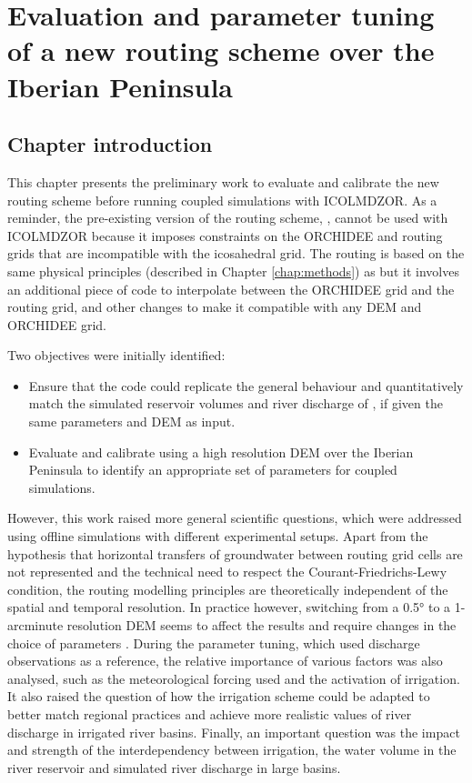 \chapter{Evaluation and parameter tuning of a new routing scheme over the Iberian Peninsula}
\label{chap:routing}
\minitoc
\pagebreak

\section{Chapter introduction}

This chapter presents the preliminary work to evaluate and calibrate the new \native routing scheme before running coupled simulations with ICOLMDZOR. As a reminder, the pre-existing version of the routing scheme, \std, cannot be used with ICOLMDZOR because it imposes constraints on the ORCHIDEE and routing grids that are incompatible with the icosahedral grid. 
The \native routing is based on the same physical principles (described in Chapter \ref{chap:methods}) as \std but it involves an additional piece of code to interpolate between the ORCHIDEE grid and the routing grid, and other changes to make it compatible with any DEM and ORCHIDEE grid.

Two objectives were initially identified:
\begin{itemize}
    \item Ensure that the \native code could replicate the general behaviour and quantitatively match the simulated reservoir volumes and river discharge of \std, if given the same parameters and DEM as input. 
    \item Evaluate and calibrate \native using a high resolution DEM over the Iberian Peninsula to identify an appropriate set of parameters for coupled simulations.
\end{itemize}

However, this work raised more general scientific questions, which were addressed using offline simulations with different experimental setups. Apart from the hypothesis that horizontal transfers of groundwater between routing grid cells are not represented and the technical need to respect the Courant-Friedrichs-Lewy condition, the routing modelling principles are theoretically independent of the spatial and temporal resolution. In practice however, switching from a 0.5° to a 1-arcminute resolution DEM seems to affect the results and require changes in the choice of parameters \citep{kilic_evaluation_2023}. During the parameter tuning, which used discharge observations as a reference, the relative importance of various factors was also analysed, such as the meteorological forcing used and the activation of irrigation. It also raised the question of how the irrigation scheme could be adapted to better match regional practices and achieve more realistic values of river discharge in irrigated river basins. Finally, an important question was the impact and strength of the interdependency between irrigation, the water volume in the river reservoir and simulated river discharge in large basins.

